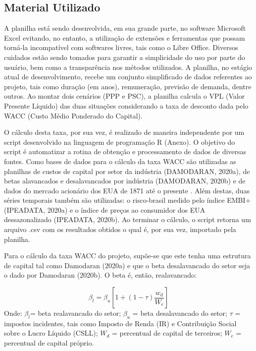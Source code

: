 \subsection{Material Utilizado}

A planilha está sendo desenvolvida, em sua grande parte, no software Microsoft Excel evitando, no entanto, a utilização de extensões e ferramentas que possam torná-la incompatível com softwares livres, tais como o Libre Office. Diversos cuidados estão sendo tomados para garantir a simplicidade do uso por parte do usuário, bem como a transparência nos métodos utilizados. A planilha, no estágio atual de desenvolvimento, recebe um conjunto simplificado de dados referentes ao projeto, tais como duração (em anos), remuneração, previsão de demanda, dentre outros. Ao montar dois cenários (PPP e PSC), a planilha calcula o VPL (Valor Presente Líquido) das duas situações considerando a taxa de desconto dada pelo WACC (Custo Médio Ponderado do Capital). 

O cálculo desta taxa, por sua vez, é realizado de maneira independente por um script desenvolvido na linguagem de programação R (Anexo). O objetivo do script é automatizar a rotina de obtenção e processamento de dados de diversas fontes. Como bases de dados para o cálculo da taxa WACC são utilizadas as planilhas de custos de capital por setor da indústria (DAMODARAN, 2020a), de betas alavancados e desalavancados por indústria (DAMODARAN, 2020b) e de dados do mercado acionário dos EUA de 1871 até o presente \cite{o2020using}. Além destas, duas séries temporais também são utilizadas: o risco-brasil medido pelo índice EMBI+ (IPEADATA, 2020a) e o índice de preços ao consumidor dos EUA dessazonalizado (IPEADATA, 2020b). Ao terminar o cálculo, o script retorna um arquivo .csv com os resultados obtidos o qual é, por sua vez, importado pela planilha.

Para o cálculo da taxa WACC do projeto, supõe-se que este tenha uma estrutura de capital tal como Damodaran (2020a) e que o beta desalavancado do setor seja o dado por Damodaran (2020b). O beta é, então, realavancado:

$$\beta_l=\beta_u\left[1+(1-\tau)\frac{w_d}{W_e}\right]$$
Onde: $\beta_l$=	beta realavancado do setor; 	$\beta_u$ =	beta desalavancado do setor; 	$τ$ = impostos incidentes, tais como Imposto de Renda (IR) e Contribuição Social sobre o Lucro Líquido (CSLL); $W_d$ =	percentual de capital de terceiros; $W_e$ =	percentual de capital próprio.

